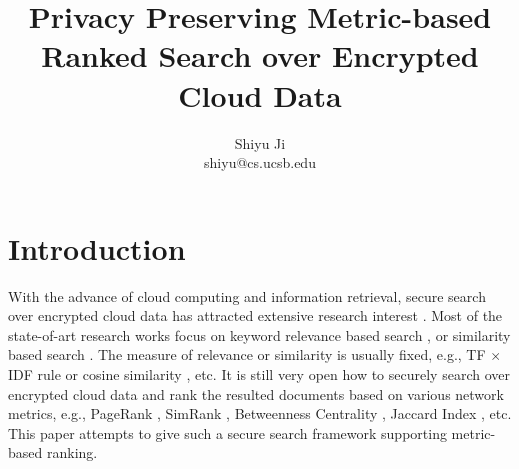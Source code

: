 \documentclass{IEEEtran}
\begin{document}
\title{\Large\bf Privacy Preserving Metric-based Ranked Search over Encrypted Cloud Data}
\author{Shiyu Ji\\ shiyu@cs.ucsb.edu}
\date{}
\maketitle

\newtheorem{definition}{Definition}
\theoremstyle{definition}
\newtheorem{theorem}{Theorem}
\theoremstyle{plain}
\newtheorem{lemma}{Lemma}
\theoremstyle{plain}
\newtheorem{corollary}{Corollary}
\theoremstyle{plain}

\section{Introduction}

With the advance of cloud computing and information retrieval, secure search over encrypted cloud data has attracted extensive research interest \cite{WC12,Cao14,Sun13,WYL14,SLH14,SLL15,LLD15,WSL15,Xia16}. Most of the state-of-art research works focus on keyword relevance based search \cite{WC12,WYL14,LLD15,SLL15,WSL15}, or similarity based search \cite{Cao14,Sun13,SLH14,Xia16}. The measure of relevance or similarity is usually fixed, e.g., TF $\times$ IDF rule \cite{WC12} or cosine similarity \cite{Cao14,Xia16}, etc. It is still very open how to securely search over encrypted cloud data and rank the resulted documents based on various network metrics, e.g., PageRank \cite{PR99}, SimRank \cite{JW02}, Betweenness Centrality \cite{Bran01}, Jaccard Index \cite{Jac89}, etc. This paper attempts to give such a secure search framework supporting metric-based ranking.
\end{document}

